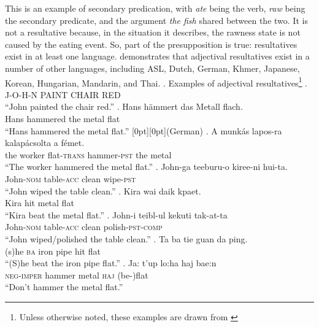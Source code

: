 \documentclass[MilwayThesis]{subfiles}
\begin{document}
This is an example of secondary predication, with \textit{ate} being the verb, \textit{raw} being the secondary predicate, and the argument \textit{the fish} shared between the two.
It is not a resultative because, in the situation it describes, the rawness state is not caused by the eating event.
So, part of the presupposition is true: resultatives exist in at least one language.
\textcite{snyder1995language,snyder2001nature} demonstrates that adjectival resultatives exist in a number of other languages, including ASL, Dutch, German, Khmer, Japanese, Korean, Hungarian, Mandarin, and Thai.
\ex. Examples of adjectival resultatives\footnote{Unless otherwise noted, these examples are drawn from \textcite{snyder2001nature}}
\a. J-O-H-N PAINT CHAIR RED\hfill\parencite[ASL,][]{kentner2018wh}\\
``John painted the chair red.''
\bg. Hans h\"ammert das Metall flach.\\
Hans hammered the metal flat\\
``Hans hammered the metal flat.'' \hfill \raisebox{1.4\baselineskip}[0pt][0pt]{(German)}
\bg. A munk\'as lapos-ra kalap\'acsolta a f\'emet.\\
the worker flat-\textsc{trans} hammer-\textsc{pst} the metal\\
``The worker hammered the metal flat.''
\bg. John-ga teeburu-o kiree-ni hui-ta.\\
John-\textsc{nom} table-\textsc{acc} clean wipe-\textsc{pst}\\
``John wiped the table clean.''
\bg. Kira wai daik kpaet.\\
Kira hit metal flat\\
``Kira beat the metal flat.''
\bg. John-i teibl-ul kekuti tak-at-ta\\
John-\textsc{nom} table-\textsc{acc} clean polish-\textsc{pst}-\textsc{comp}\\
``John wiped/polished the table clean.''
\bg. Ta ba tie guan da ping.\\
(s)he \textsc{ba} iron pipe hit flat\\
``(S)he beat the iron pipe flat.''
\bg. Ja: t'up lo:ha\textglotstop{} haj bae:n\\
\textsc{neg-imper} hammer metal \textsc{haj} (be-)flat\\
``Don't hammer the metal flat.''
\end{document}
